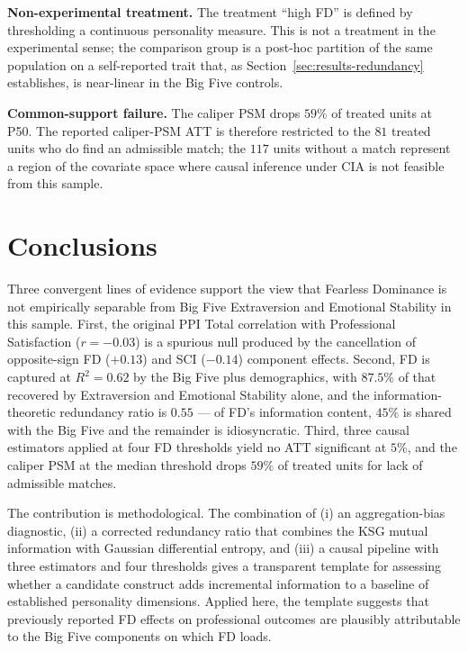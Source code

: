 \documentclass[11pt,a4paper]{article}
\begin{document}
\textbf{Non-experimental treatment.} The treatment ``high FD'' is
defined by thresholding a continuous personality measure. This is
not a treatment in the experimental sense; the comparison group is a
post-hoc partition of the same population on a self-reported trait
that, as Section~\ref{sec:results-redundancy} establishes, is
near-linear in the Big Five controls.

\textbf{Common-support failure.} The caliper PSM drops $59\%$ of
treated units at P50. The reported caliper-PSM ATT is therefore
restricted to the $81$ treated units who do find an admissible
match; the $117$ units without a match represent a region of the
covariate space where causal inference under CIA is not feasible
from this sample.

\section{Conclusions}
\label{sec:conclusion}

Three convergent lines of evidence support the view that Fearless
Dominance is not empirically separable from Big Five Extraversion and
Emotional Stability in this sample. First, the original PPI Total
correlation with Professional Satisfaction ($r=-0.03$) is a spurious
null produced by the cancellation of opposite-sign FD ($+0.13$) and
SCI ($-0.14$) component effects. Second, FD is captured at $R^2=0.62$
by the Big Five plus demographics, with $87.5\%$ of that recovered by
Extraversion and Emotional Stability alone, and the
information-theoretic redundancy ratio is $0.55$ --- of FD's
information content, $45\%$ is shared with the Big Five and the
remainder is idiosyncratic. Third, three causal estimators applied at
four FD thresholds yield no ATT significant at $5\%$, and the caliper
PSM at the median threshold drops $59\%$ of treated units for lack of
admissible matches.

The contribution is methodological. The combination of (i) an
aggregation-bias diagnostic, (ii) a corrected redundancy ratio that
combines the KSG mutual information with Gaussian differential
entropy, and (iii) a causal pipeline with three estimators and four
thresholds gives a transparent template for assessing whether a
candidate construct adds incremental information to a baseline of
established personality dimensions. Applied here, the template
suggests that previously reported FD effects on professional outcomes
are plausibly attributable to the Big Five components on which FD
loads.
\end{document}
